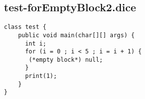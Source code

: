 \subsection{test-forEmptyBlock2.dice}
\begin{verbatim}
class test {
	public void main(char[][] args) {
	  int i;
	  for (i = 0 ; i < 5 ; i = i + 1) {
	   (*empty block*) null;
	  }
	  print(1);
	}
}
\end{verbatim}